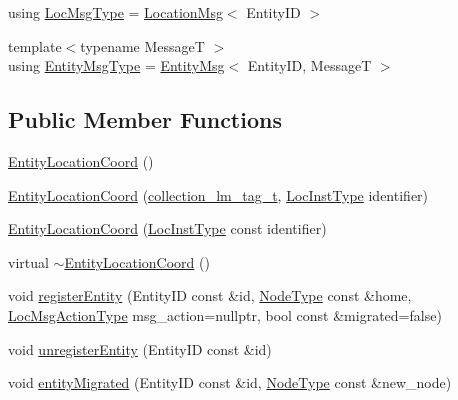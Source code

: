 \begin{DoxyCompactItemize}
\item 
using \hyperlink{structvt_1_1location_1_1_entity_location_coord_a8799cbd5fb0fb04cfdd1012fe1d5908f}{Loc\+Msg\+Type} = \hyperlink{structvt_1_1location_1_1_location_msg}{Location\+Msg}$<$ Entity\+ID $>$
\item 
{\footnotesize template$<$typename MessageT $>$ }\\using \hyperlink{structvt_1_1location_1_1_entity_location_coord_a69e037fef241a04659b4068c8ae1513f}{Entity\+Msg\+Type} = \hyperlink{structvt_1_1location_1_1_entity_msg}{Entity\+Msg}$<$ Entity\+ID, MessageT $>$
\end{DoxyCompactItemize}
\subsection*{Public Member Functions}
\begin{DoxyCompactItemize}
\item 
\hyperlink{structvt_1_1location_1_1_entity_location_coord_a84d2166e5a2c192b081c222e15e93882}{Entity\+Location\+Coord} ()
\item 
\hyperlink{structvt_1_1location_1_1_entity_location_coord_a0a25560f861221daafca33ce2657f04b}{Entity\+Location\+Coord} (\hyperlink{structvt_1_1location_1_1collection__lm__tag__t}{collection\+\_\+lm\+\_\+tag\+\_\+t}, \hyperlink{namespacevt_1_1location_a4db6456e8024af2d23fc5ae560fef866}{Loc\+Inst\+Type} identifier)
\item 
\hyperlink{structvt_1_1location_1_1_entity_location_coord_a5dcddcc605ab3cd16d94161e895b88e3}{Entity\+Location\+Coord} (\hyperlink{namespacevt_1_1location_a4db6456e8024af2d23fc5ae560fef866}{Loc\+Inst\+Type} const identifier)
\item 
virtual \hyperlink{structvt_1_1location_1_1_entity_location_coord_af68fd9bb9fcbf02f693ba2af503ed409}{$\sim$\+Entity\+Location\+Coord} ()
\item 
void \hyperlink{structvt_1_1location_1_1_entity_location_coord_a3d7f6c252ad5cb8d1084620946245970}{register\+Entity} (Entity\+ID const \&id, \hyperlink{namespacevt_a866da9d0efc19c0a1ce79e9e492f47e2}{Node\+Type} const \&home, \hyperlink{namespacevt_1_1location_ad0a130e4d79e745543925240e13e8f08}{Loc\+Msg\+Action\+Type} msg\+\_\+action=nullptr, bool const \&migrated=false)
\item 
void \hyperlink{structvt_1_1location_1_1_entity_location_coord_a076ec3a6b06e74567e7281adb0645cd7}{unregister\+Entity} (Entity\+ID const \&id)
\item 
void \hyperlink{structvt_1_1location_1_1_entity_location_coord_adbace590ba52c45ca7832635f0e372b1}{entity\+Migrated} (Entity\+ID const \&id, \hyperlink{namespacevt_a866da9d0efc19c0a1ce79e9e492f47e2}{Node\+Type} const \&new\+\_\+node)

\end{DoxyCompactItemize}
